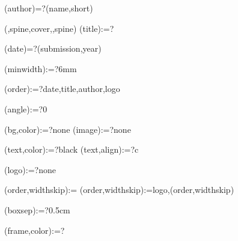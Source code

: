 
%


\makeatletter



\spine(author)=?{\thedocauthor(name,short)}

({\@LANG@COVER,spine,cover},{\@LANG@COVER,spine})%
\spine(title):=?{\match}

\spine(date)=?{\thentdocdate(submission,year)}


\spine(minwidth):=?{6mm}

\spine(order):=?{date,title,author,logo}

\spine(angle):=?{0}

\spine(bg,color):=?{none}
\spine(image):=?{none}

\spine(text,color):=?{black}
\spine(text,align):=?{c}

\spine(logo):=?{none}

\spine(order,widthskip):={}
\spine(order,widthskip):={logo,\thespine(order,widthskip)}

\spine(boxsep):=?{0.5cm}

\spine(frame,color):=?{}

